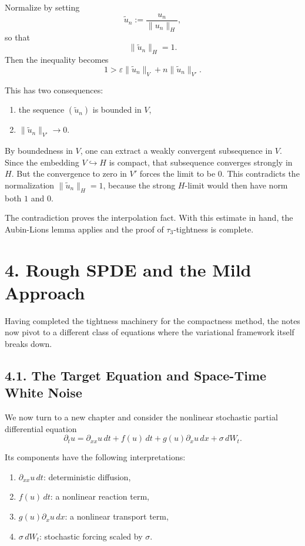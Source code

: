 \documentclass[11pt]{article}
\theoremstyle{definition}
\theoremstyle{remark}
\begin{document}
Normalize by setting
\[
\widetilde u_n:=\frac{u_n}{\|u_n\|_H},
\]
so that
\[
\|\widetilde u_n\|_H=1.
\]
Then the inequality becomes
\[
1>\varepsilon\|\widetilde u_n\|_V+n\|\widetilde u_n\|_{V'}.
\]

This has two consequences:
\begin{enumerate}
\item the sequence \((\widetilde u_n)\) is bounded in \(V\),
\item \(\|\widetilde u_n\|_{V'}\to 0\).
\end{enumerate}

By boundedness in \(V\), one can extract a weakly convergent subsequence in \(V\). Since the embedding \(V\hookrightarrow H\) is compact, that subsequence converges strongly in \(H\). But the convergence to zero in \(V'\) forces the limit to be \(0\). This contradicts the normalization \(\|\widetilde u_n\|_H=1\), because the strong \(H\)-limit would then have norm both \(1\) and \(0\).

The contradiction proves the interpolation fact. With this estimate in hand, the Aubin-Lions lemma applies and the proof of \(\tau_3\)-tightness is complete.

\section*{4. Rough SPDE and the Mild Approach}
Having completed the tightness machinery for the compactness method, the notes now pivot to a different class of equations where the variational framework itself breaks down.

\subsection*{4.1. The Target Equation and Space-Time White Noise}
We now turn to a new chapter and consider the nonlinear stochastic partial differential equation
\[
\partial_t u=\partial_{xx}u\,dt+f(u)\,dt+g(u)\partial_x u\,dx+\sigma\,dW_t.
\]

Its components have the following interpretations:
\begin{enumerate}
\item \(\partial_{xx}u\,dt\): deterministic diffusion,
\item \(f(u)\,dt\): a nonlinear reaction term,
\item \(g(u)\partial_x u\,dx\): a nonlinear transport term,
\item \(\sigma\,dW_t\): stochastic forcing scaled by \(\sigma\).
\end{enumerate}
\end{document}
